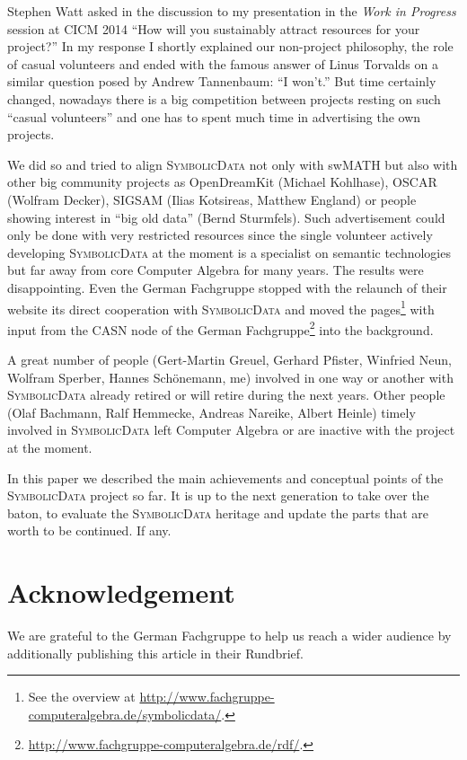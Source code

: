 \documentclass[12pt]{article}
\def\SD{\textsc{Sym\-bolic\-Data}}
\begin{document}
Stephen Watt asked in the discussion to my presentation in the \emph{Work in
  Progress} session at CICM 2014 ``How will you sustainably attract resources
for your project?'' In my response I shortly explained our non-project
philosophy, the role of casual volunteers and ended with the famous answer of
Linus Torvalds on a similar question posed by Andrew Tannenbaum: ``I won't.''
But time certainly changed, nowadays there is a big competition between
projects resting on such ``casual volunteers'' and one has to spent much time
in advertising the own projects.

We did so and tried to align {\SD} not only with swMATH but also with other big
community projects as OpenDreamKit (Michael Kohlhase), OSCAR (Wolfram Decker),
SIGSAM (Ilias Kotsireas, Matthew England) or people showing interest in ``big
old data'' (Bernd Sturmfels). Such advertisement could only be done with very
restricted resources since the single volunteer actively developing {\SD} at
the moment is a specialist on semantic technologies but far away from core
Computer Algebra for many years.  The results were disappointing.  Even the
German Fachgruppe stopped with the relaunch of their website its direct
cooperation with {\SD} and moved the pages\footnote{See the overview at
  \url{http://www.fachgruppe-computeralgebra.de/symbolicdata/}.} with input
from the CASN node of the German
Fachgruppe\footnote{\url{http://www.fachgruppe-computeralgebra.de/rdf/}.} into
the background.

A great number of people (Gert-Martin Greuel, Gerhard Pfister, Winfried Neun,
Wolfram Sperber, Hannes Schöne\-mann, me) involved in one way or another with
{\SD} already retired or will retire during the next years.  Other people (Olaf
Bachmann, Ralf Hemmecke, Andreas Nareike, Albert Heinle) timely involved in
{\SD} left Computer Algebra or are inactive with the project at the moment.

In this paper we described the main achievements and conceptual points of the
{\SD} project so far.  It is up to the next generation to take over the baton,
to evaluate the {\SD} heritage and update the parts that are worth to be
continued. If any.

\section{Acknowledgement}
 
We are grateful to the German Fachgruppe to help us reach a wider audience by
additionally publishing this article in their Rundbrief.
\end{document}
